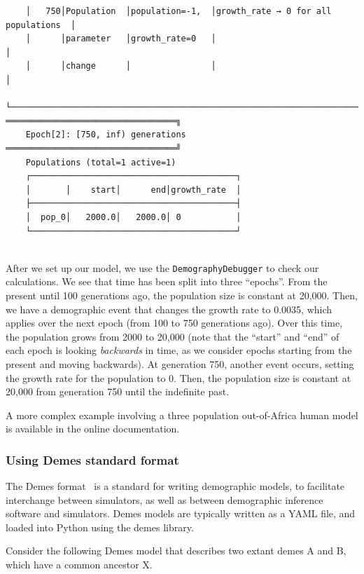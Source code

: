 \documentclass[graybox]{svmult}
\begin{document}
\begin{footnotesize}
\begin{verbatim}
    │   750│Population  │population=-1,  │growth_rate → 0 for all populations  │
    │      │parameter   │growth_rate=0   │                                     │
    │      │change      │                │                                     │
    └──────────────────────────────────────────────────────────────────────────┘
══════════════════════════════════╗
    Epoch[2]: [750, inf) generations
══════════════════════════════════╝
    Populations (total=1 active=1)
    ┌─────────────────────────────────────────┐
    │       │    start│      end│growth_rate  │
    ├─────────────────────────────────────────┤
    │  pop_0│   2000.0│   2000.0│ 0           │
    └─────────────────────────────────────────┘


\end{verbatim}
\end{footnotesize}

    After we set up our model, we use the \texttt{DemographyDebugger} to
check our calculations. We see that time has been split into three
``epochs''. From the present until 100 generations ago, the
population size is constant at 20,000. Then, we have a demographic event
that changes the growth rate to 0.0035, which applies over the next
epoch (from 100 to 750 generations ago). Over this time, the population
grows from 2000 to 20,000 (note that the ``start'' and
``end'' of each epoch is looking \emph{backwards} in time, as we consider
epochs starting from the present and moving backwards). At generation
750, another event occurs, setting the growth rate for the population to
0. Then, the population size is constant at 20,000 from generation 750
until the indefinite past.

A more complex example involving a three population out-of-Africa human
model is available in the online documentation.

\subsubsection{Using Demes standard format}\label{using-demes-standard-format}

The Demes format~\citep{gower_demes_2022} is a standard for writing
demographic models, to facilitate interchange between simulators, as well as between
demographic inference software and simulators. Demes models are typically written as a
YAML file, and loaded into Python using the demes library.

Consider the following Demes model that describes two extant demes A and B, which
have a common ancestor X.
\end{document}
